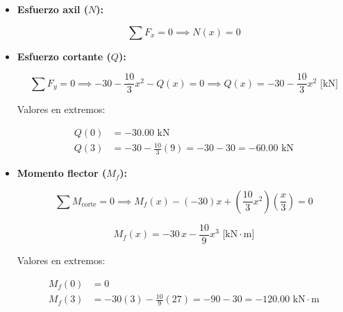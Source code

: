 \begin{itemize}

    \item \textbf{Esfuerzo axil ($N$):}

          \begin{equation}

              \sum F_x = 0 \implies \boxed{N(x) = 0}

          \end{equation}

    \item \textbf{Esfuerzo cortante ($Q$):}

          \begin{equation}

              \sum F_y = 0 \implies -30 - \frac{10}{3}x^2 - Q(x) = 0 \implies \boxed{Q(x) = -30 - \frac{10}{3}x^2\text{ [kN]}}

          \end{equation}

          Valores en extremos:

          \begin{align*}

              Q(0) & = -30.00\text{ kN}                                    \\

              Q(3) & = -30 - \frac{10}{3}(9) = -30 - 30 = -60.00\text{ kN}

          \end{align*}

    \item \textbf{Momento flector ($M_f$):}

          \begin{equation}

              \sum M_{\text{corte}} = 0 \implies M_f(x) - (-30)x + \left(\frac{10}{3}x^2\right)\left(\frac{x}{3}\right) = 0

          \end{equation}

          \begin{equation}

              \boxed{M_f(x) = -30\,x - \frac{10}{9}x^3\text{ [kN}\cdot\text{m]}}

          \end{equation}

          Valores en extremos:

          \begin{align*}

              M_f(0) & = 0                                                                     \\

              M_f(3) & = -30(3) - \frac{10}{9}(27) = -90 - 30 = -120.00\text{ kN}\cdot\text{m}

          \end{align*}

\end{itemize}



